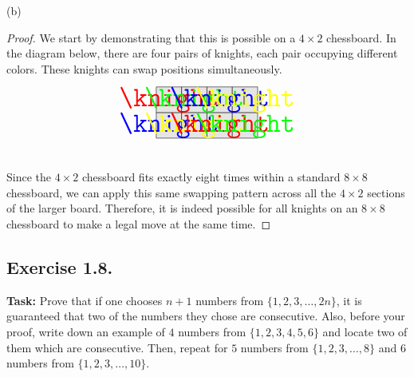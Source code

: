 \documentclass{article}
\begin{document}
\noindent (b)

\begin{proof}
We start by demonstrating that this is possible on a $4 \times 2$ chessboard. In the diagram below, there are four pairs of knights, each pair occupying different colors. These knights can swap positions simultaneously. \\
\[
\begin{tikzpicture}[scale=0.8]

\definecolor{color1}{rgb}{1,0,0}   %
\definecolor{color2}{rgb}{0,1,0}   %
\definecolor{color3}{rgb}{0,0,1}   %
\definecolor{color4}{rgb}{1,1,0}   %

\foreach \x in {0,1,2,3} {
    \foreach \y in {0,1} {
        \fill[gray!20] (\x,\y) rectangle (\x+1,\y+1); 
        \draw (\x,\y) rectangle (\x+1,\y+1);
    }
}

\node at (0.5,1.5) {\textcolor{color1}{\Huge\knight}}; %
\node at (1.5,1.5) {\textcolor{color2}{\Huge\knight}}; %
\node at (2.5,1.5) {\textcolor{color3}{\Huge\knight}}; %
\node at (3.5,1.5) {\textcolor{color4}{\Huge\knight}}; %

\node at (0.5,0.5) {\textcolor{color3}{\Huge\knight}}; %
\node at (1.5,0.5) {\textcolor{color4}{\Huge\knight}}; %
\node at (2.5,0.5) {\textcolor{color1}{\Huge\knight}}; %
\node at (3.5,0.5) {\textcolor{color2}{\Huge\knight}}; %

\end{tikzpicture}
\] \\

\noindent Since the $4 \times 2$ chessboard fits exactly eight times within a standard $8 \times 8$ chessboard, we can apply this same swapping pattern across all the $4 \times 2$ sections of the larger board. Therefore, it is indeed possible for all knights on an $8 \times 8$ chessboard to make a legal move at the same time.

\end{proof}

\newpage

\subsection{Exercise 1.8.}
\textbf{Task:} Prove that if one chooses $n + 1$ numbers from $\{1,2,3,\dots,2n\}$, it is guaranteed that two of the numbers they chose are consecutive. Also, before your proof, write down an example of $4$ numbers from $\{1,2,3,4,5,6\}$ and locate two of them which are consecutive. Then, repeat for $5$ numbers from $\{1,2,3,\dots,8\}$ and $6$ numbers from $\{1,2,3,\dots,10\}$.
\end{document}

